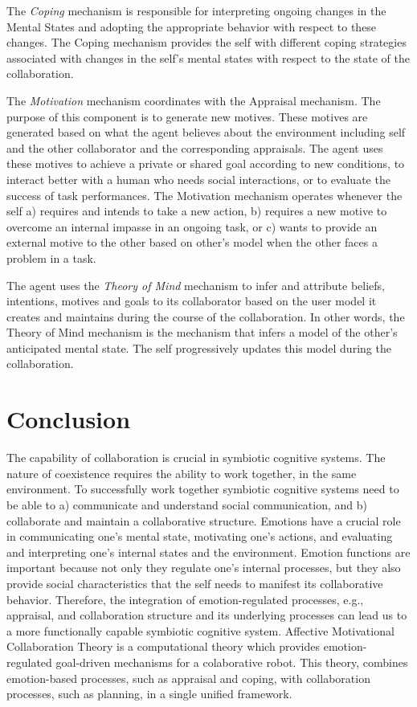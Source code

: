 \documentclass[letterpaper]{article}
\begin{document}
The \textit{Coping} mechanism is responsible for interpreting ongoing changes
in the Mental States and adopting the appropriate behavior with respect to these
changes. The Coping mechanism provides the self with different coping strategies
associated with changes in the self's mental states with respect to the state of
the collaboration.

The \textit{Motivation} mechanism coordinates with the Appraisal mechanism. The
purpose of this component is to generate new motives. These motives are
generated based on what the agent believes about the environment including self
and the other collaborator and the corresponding appraisals. The agent uses
these motives to achieve a private or shared goal according to new conditions,
to interact better with a human who needs social interactions, or to evaluate
the success of task performances. The Motivation mechanism operates whenever the
self a) requires and intends to take a new action, b) requires a new motive to
overcome an internal impasse in an ongoing task, or c) wants to provide an
external motive to the other based on other's model when the other faces a
problem in a task.

The agent uses the \textit{Theory of Mind} mechanism to infer and attribute
beliefs, intentions, motives and goals to its collaborator based on the user
model it creates and maintains during the course of the collaboration. In
other words, the Theory of Mind mechanism is the mechanism that infers a model
of the other's anticipated mental state. The self progressively updates this
model during the collaboration.

\section{Conclusion}

The capability of collaboration is crucial in symbiotic cognitive systems. The
nature of coexistence requires the ability to work together, in the same
environment. To successfully work together symbiotic cognitive systems need to
be able to a) communicate and understand social communication, and b)
collaborate and maintain a collaborative structure. Emotions have a crucial role
in communicating one's mental state, motivating one's actions, and evaluating
and interpreting one's internal states and the environment. Emotion functions
are important because not only they regulate one's internal processes, but they
also provide social characteristics that the self needs to manifest its
collaborative behavior. Therefore, the integration of emotion-regulated
processes, e.g., appraisal, and collaboration structure and its underlying
processes can lead us to a more functionally capable symbiotic cognitive system.
Affective Motivational Collaboration Theory is a computational theory which
provides emotion-regulated goal-driven mechanisms for a colaborative robot. This
theory, combines emotion-based processes, such as appraisal and coping, with
collaboration processes, such as planning, in a single unified framework.
\end{document}
